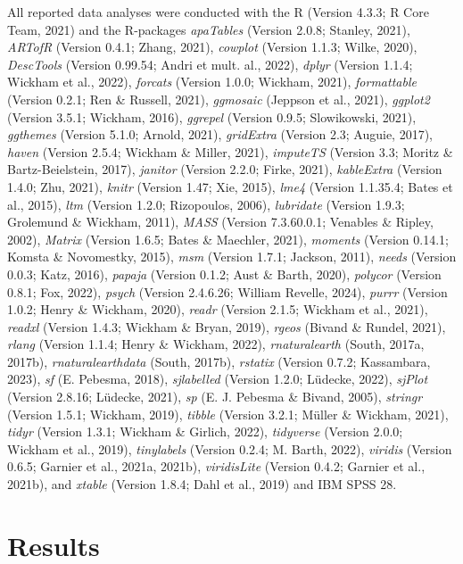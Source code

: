 \documentclass[
  man]{apa6}
\begin{document}
All reported data analyses were conducted with the R (Version 4.3.3; R Core Team, 2021) and the R-packages \emph{apaTables} (Version 2.0.8; Stanley, 2021), \emph{ARTofR} (Version 0.4.1; Zhang, 2021), \emph{cowplot} (Version 1.1.3; Wilke, 2020), \emph{DescTools} (Version 0.99.54; Andri et mult. al., 2022), \emph{dplyr} (Version 1.1.4; Wickham et al., 2022), \emph{forcats} (Version 1.0.0; Wickham, 2021), \emph{formattable} (Version 0.2.1; Ren \& Russell, 2021), \emph{ggmosaic} (Jeppson et al., 2021), \emph{ggplot2} (Version 3.5.1; Wickham, 2016), \emph{ggrepel} (Version 0.9.5; Slowikowski, 2021), \emph{ggthemes} (Version 5.1.0; Arnold, 2021), \emph{gridExtra} (Version 2.3; Auguie, 2017), \emph{haven} (Version 2.5.4; Wickham \& Miller, 2021), \emph{imputeTS} (Version 3.3; Moritz \& Bartz-Beielstein, 2017), \emph{janitor} (Version 2.2.0; Firke, 2021), \emph{kableExtra} (Version 1.4.0; Zhu, 2021), \emph{knitr} (Version 1.47; Xie, 2015), \emph{lme4} (Version 1.1.35.4; Bates et al., 2015), \emph{ltm} (Version 1.2.0; Rizopoulos, 2006), \emph{lubridate} (Version 1.9.3; Grolemund \& Wickham, 2011), \emph{MASS} (Version 7.3.60.0.1; Venables \& Ripley, 2002), \emph{Matrix} (Version 1.6.5; Bates \& Maechler, 2021), \emph{moments} (Version 0.14.1; Komsta \& Novomestky, 2015), \emph{msm} (Version 1.7.1; Jackson, 2011), \emph{needs} (Version 0.0.3; Katz, 2016), \emph{papaja} (Version 0.1.2; Aust \& Barth, 2020), \emph{polycor} (Version 0.8.1; Fox, 2022), \emph{psych} (Version 2.4.6.26; William Revelle, 2024), \emph{purrr} (Version 1.0.2; Henry \& Wickham, 2020), \emph{readr} (Version 2.1.5; Wickham et al., 2021), \emph{readxl} (Version 1.4.3; Wickham \& Bryan, 2019), \emph{rgeos} (Bivand \& Rundel, 2021), \emph{rlang} (Version 1.1.4; Henry \& Wickham, 2022), \emph{rnaturalearth} (South, 2017a, 2017b), \emph{rnaturalearthdata} (South, 2017b), \emph{rstatix} (Version 0.7.2; Kassambara, 2023), \emph{sf} (E. Pebesma, 2018), \emph{sjlabelled} (Version 1.2.0; Lüdecke, 2022), \emph{sjPlot} (Version 2.8.16; Lüdecke, 2021), \emph{sp} (E. J. Pebesma \& Bivand, 2005), \emph{stringr} (Version 1.5.1; Wickham, 2019), \emph{tibble} (Version 3.2.1; Müller \& Wickham, 2021), \emph{tidyr} (Version 1.3.1; Wickham \& Girlich, 2022), \emph{tidyverse} (Version 2.0.0; Wickham et al., 2019), \emph{tinylabels} (Version 0.2.4; M. Barth, 2022), \emph{viridis} (Version 0.6.5; Garnier et al., 2021a, 2021b), \emph{viridisLite} (Version 0.4.2; Garnier et al., 2021b), and \emph{xtable} (Version 1.8.4; Dahl et al., 2019) and IBM SPSS 28.

\section{Results}\label{results}
\end{document}
